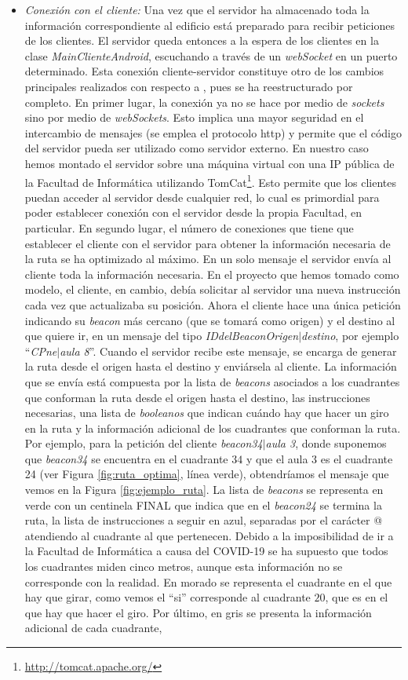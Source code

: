 \begin{itemize}
	\item \textit{Conexión con el cliente:} Una vez que el servidor ha almacenado toda la información correspondiente al edificio está preparado para recibir peticiones de los clientes. El servidor queda entonces a la espera de los clientes en la clase \textit{MainClienteAndroid}, escuchando a través de un \textit{webSocket} en un puerto determinado. Esta conexión cliente-servidor constituye otro de los cambios principales realizados con respecto a \cite{TFGguia}, pues se ha reestructurado por completo. En primer lugar, la conexión ya no se hace por medio de \textit{sockets} sino por medio de \textit{webSockets}. Esto implica una mayor seguridad en el intercambio de mensajes (se emplea el protocolo http) y permite que el código del servidor pueda ser utilizado como servidor externo. En nuestro caso hemos montado el servidor sobre una máquina virtual con una IP pública de la Facultad de Informática utilizando TomCat\footnote{\url{http://tomcat.apache.org/}}. Esto permite que los clientes puedan acceder al servidor desde cualquier red, lo cual es primordial para poder establecer conexión con el servidor desde la propia Facultad, en particular. En segundo lugar, el número de conexiones que tiene que establecer el cliente con el servidor para obtener la información necesaria de la ruta se ha optimizado al máximo. En un solo mensaje el servidor envía al cliente toda la información necesaria. En el proyecto que hemos tomado como modelo, el cliente, en cambio, debía solicitar al servidor una nueva instrucción cada vez que actualizaba su posición. Ahora el cliente hace una única petición indicando su \textit{beacon} más cercano (que se tomará como origen) y el destino al que quiere ir, en un mensaje del tipo \textit{IDdelBeaconOrigen$|$destino}, por ejemplo ``\textit{CPne$|$aula 8}''. Cuando el servidor recibe este mensaje, se encarga de generar la ruta desde el origen hasta el destino y enviársela al cliente. La información que se envía está compuesta por la lista de \textit{beacons} asociados a los cuadrantes que conforman la ruta desde el origen hasta el destino, las instrucciones necesarias, una lista de \textit{booleanos} que indican cuándo hay que hacer un giro en la ruta y la información adicional de los cuadrantes que conforman la ruta. Por ejemplo, para la petición del cliente \textit{beacon34$|$aula 3}, donde suponemos que \textit{beacon34} se encuentra en el cuadrante $34$ y que el aula 3 es el cuadrante 24 (ver Figura \ref{fig:ruta_optima}, línea verde), obtendríamos el mensaje que vemos en la Figura \ref{fig:ejemplo_ruta}. La lista de \textit{beacons} se representa en verde con un centinela FINAL que indica que en el \textit{beacon24} se termina la ruta, la lista de instrucciones a seguir en azul, separadas por el carácter @ atendiendo al cuadrante al que pertenecen. Debido a la imposibilidad de ir a la Facultad de Informática a causa del COVID-19 se ha supuesto que todos los cuadrantes miden cinco metros, aunque esta información no se corresponde con la realidad. En morado se representa el cuadrante en el que hay que girar, como vemos el ``si'' corresponde al cuadrante $20$, que es en el que hay que hacer el giro. Por último, en gris se presenta la información adicional de cada cuadrante, 
\end{itemize}

